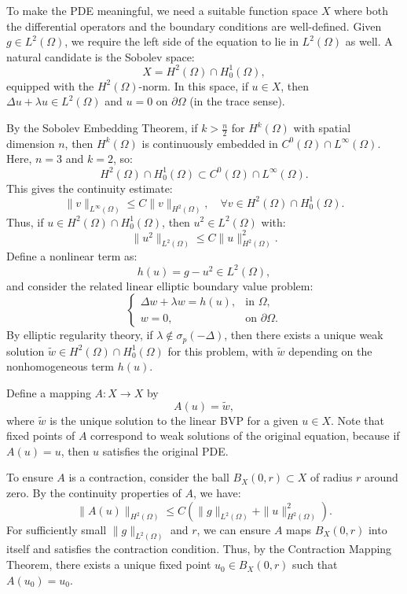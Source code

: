 \documentclass[12pt, reqno]{amsart}
\theoremstyle{definition}
\numberwithin{equation}{section}
\begin{document}
To make the PDE meaningful, we need a suitable function space \( X \) where both the differential operators and the boundary conditions are well-defined. Given \( g \in L^2(\Omega) \), we require the left side of the equation to lie in \( L^2(\Omega) \) as well. A natural candidate is the Sobolev space:
\[
X = H^2(\Omega) \cap H_0^1(\Omega),
\]
equipped with the \( H^2(\Omega) \)-norm. In this space, if \( u \in X \), then \( \Delta u + \lambda u \in L^2(\Omega) \) and \( u = 0 \) on \( \partial \Omega \) (in the trace sense).

By the Sobolev Embedding Theorem, if \( k > \frac{n}{2} \) for \( H^k(\Omega) \) with spatial dimension \( n \), then \( H^k(\Omega) \) is continuously embedded in \( C^0(\Omega) \cap L^{\infty}(\Omega) \). Here, \( n = 3 \) and \( k = 2 \), so:
\[
H^2(\Omega) \cap H_0^1(\Omega) \subset C^0(\Omega) \cap L^{\infty}(\Omega).
\]
This gives the continuity estimate:
\[
\|v\|_{L^{\infty}(\Omega)} \leq C \|v\|_{H^2(\Omega)}, \quad \forall v \in H^2(\Omega) \cap H_0^1(\Omega).
\]
Thus, if \( u \in H^2(\Omega) \cap H_0^1(\Omega) \), then \( u^2 \in L^2(\Omega) \) with:
\[
\|u^2\|_{L^2(\Omega)} \leq C \|u\|_{H^2(\Omega)}^2.
\]
Define a nonlinear term as:
\[
h(u) = g - u^2 \in L^2(\Omega),
\]
and consider the related linear elliptic boundary value problem:
\[
\begin{cases}
\Delta w + \lambda w = h(u), & \text{in } \Omega, \\
w = 0, & \text{on } \partial \Omega.
\end{cases}
\]
By elliptic regularity theory, if \( \lambda \notin \sigma_p(-\Delta) \), then there exists a unique weak solution \( \tilde{w} \in H^2(\Omega) \cap H_0^1(\Omega) \) for this problem, with \( \tilde{w} \) depending on the nonhomogeneous term \( h(u) \).

Define a mapping \( A: X \to X \) by
\[
A(u) = \tilde{w},
\]
where \( \tilde{w} \) is the unique solution to the linear BVP for a given \( u \in X \). Note that fixed points of \( A \) correspond to weak solutions of the original equation, because if \( A(u) = u \), then \( u \) satisfies the original PDE.

To ensure \( A \) is a contraction, consider the ball \( B_X(0, r) \subset X \) of radius \( r \) around zero. By the continuity properties of \( A \), we have:
\[
\|A(u)\|_{H^2(\Omega)} \leq C (\|g\|_{L^2(\Omega)} + \|u\|_{H^2(\Omega)}^2).
\]
For sufficiently small \( \|g\|_{L^2(\Omega)} \) and \( r \), we can ensure \( A \) maps \( B_X(0, r) \) into itself and satisfies the contraction condition. Thus, by the Contraction Mapping Theorem, there exists a unique fixed point \( u_0 \in B_X(0, r) \) such that \( A(u_0) = u_0 \).
\end{document}
